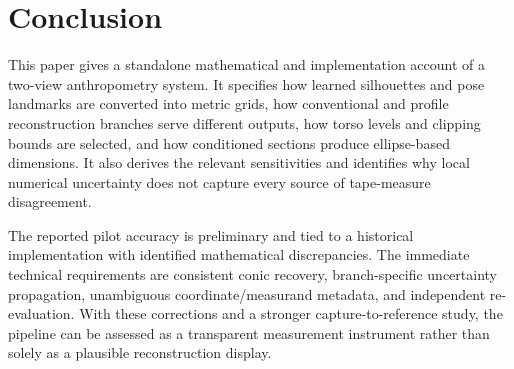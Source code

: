 \section{Conclusion}
This paper gives a standalone mathematical and implementation account of a two-view anthropometry system. It specifies how learned silhouettes and pose landmarks are converted into metric grids, how conventional and profile reconstruction branches serve different outputs, how torso levels and clipping bounds are selected, and how conditioned sections produce ellipse-based dimensions. It also derives the relevant sensitivities and identifies why local numerical uncertainty does not capture every source of tape-measure disagreement.

The reported pilot accuracy is preliminary and tied to a historical implementation with identified mathematical discrepancies. The immediate technical requirements are consistent conic recovery, branch-specific uncertainty propagation, unambiguous coordinate/measurand metadata, and independent re-evaluation. With these corrections and a stronger capture-to-reference study, the pipeline can be assessed as a transparent measurement instrument rather than solely as a plausible reconstruction display.

\appendix
